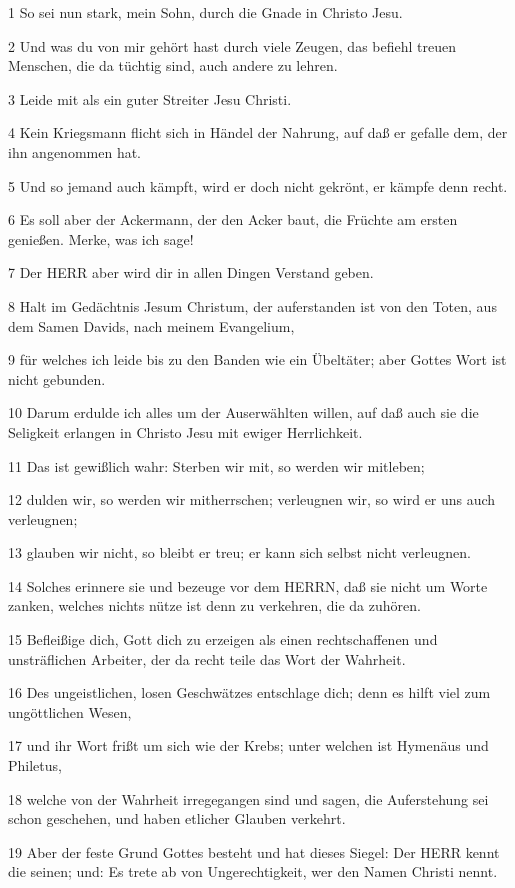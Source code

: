 \par 1 So sei nun stark, mein Sohn, durch die Gnade in Christo Jesu.
\par 2 Und was du von mir gehört hast durch viele Zeugen, das befiehl treuen Menschen, die da tüchtig sind, auch andere zu lehren.
\par 3 Leide mit als ein guter Streiter Jesu Christi.
\par 4 Kein Kriegsmann flicht sich in Händel der Nahrung, auf daß er gefalle dem, der ihn angenommen hat.
\par 5 Und so jemand auch kämpft, wird er doch nicht gekrönt, er kämpfe denn recht.
\par 6 Es soll aber der Ackermann, der den Acker baut, die Früchte am ersten genießen. Merke, was ich sage!
\par 7 Der HERR aber wird dir in allen Dingen Verstand geben.
\par 8 Halt im Gedächtnis Jesum Christum, der auferstanden ist von den Toten, aus dem Samen Davids, nach meinem Evangelium,
\par 9 für welches ich leide bis zu den Banden wie ein Übeltäter; aber Gottes Wort ist nicht gebunden.
\par 10 Darum erdulde ich alles um der Auserwählten willen, auf daß auch sie die Seligkeit erlangen in Christo Jesu mit ewiger Herrlichkeit.
\par 11 Das ist gewißlich wahr: Sterben wir mit, so werden wir mitleben;
\par 12 dulden wir, so werden wir mitherrschen; verleugnen wir, so wird er uns auch verleugnen;
\par 13 glauben wir nicht, so bleibt er treu; er kann sich selbst nicht verleugnen.
\par 14 Solches erinnere sie und bezeuge vor dem HERRN, daß sie nicht um Worte zanken, welches nichts nütze ist denn zu verkehren, die da zuhören.
\par 15 Befleißige dich, Gott dich zu erzeigen als einen rechtschaffenen und unsträflichen Arbeiter, der da recht teile das Wort der Wahrheit.
\par 16 Des ungeistlichen, losen Geschwätzes entschlage dich; denn es hilft viel zum ungöttlichen Wesen,
\par 17 und ihr Wort frißt um sich wie der Krebs; unter welchen ist Hymenäus und Philetus,
\par 18 welche von der Wahrheit irregegangen sind und sagen, die Auferstehung sei schon geschehen, und haben etlicher Glauben verkehrt.
\par 19 Aber der feste Grund Gottes besteht und hat dieses Siegel: Der HERR kennt die seinen; und: Es trete ab von Ungerechtigkeit, wer den Namen Christi nennt.
